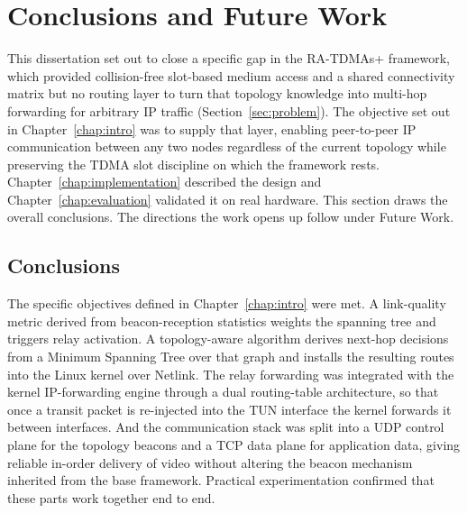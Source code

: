 
\chapter{Conclusions and Future Work}
\label{chap:conclusions}

This dissertation set out to close a specific gap in the RA-TDMAs+ framework,
which provided collision-free slot-based medium access and a shared connectivity
matrix but no routing layer to turn that topology knowledge into multi-hop
forwarding for arbitrary IP traffic (Section~\ref{sec:problem}). The objective set
out in Chapter~\ref{chap:intro} was to supply that layer, enabling peer-to-peer IP
communication between any two nodes regardless of the current topology while
preserving the TDMA slot discipline on which the framework rests.
Chapter~\ref{chap:implementation} described the design and
Chapter~\ref{chap:evaluation} validated it on real hardware. This section draws
the overall conclusions. The directions the work opens up follow under Future
Work.

\section{Conclusions}
\label{sec:conclusions}

The specific objectives defined in Chapter~\ref{chap:intro} were met. A
link-quality metric derived from beacon-reception statistics weights the spanning
tree and triggers relay activation. A topology-aware algorithm derives next-hop
decisions from a Minimum Spanning Tree over that graph and installs the resulting
routes into the Linux kernel over Netlink. The relay forwarding was integrated
with the kernel IP-forwarding engine through a dual routing-table architecture, so
that once a transit packet is re-injected into the TUN interface the kernel
forwards it between interfaces. And the communication stack was split into a UDP
control plane for the topology beacons and a TCP data plane for application data,
giving reliable in-order delivery of video without altering the beacon mechanism
inherited from the base framework. Practical experimentation confirmed that these
parts work together end to end.

